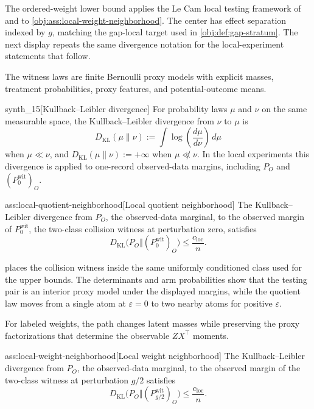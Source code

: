 The ordered-weight lower bound applies the Le Cam local testing framework of \citet{LeCam1986} and \citet{PolyanskiyWu2019} to \cref{obj:ass:local-weight-neighborhood}. The center has effect separation indexed by \(g\), matching the gap-local target used in \cref{obj:def:gap-stratum}. The next display repeats the same divergence notation for the local-experiment statements that follow.

The witness laws are finite Bernoulli proxy models with explicit masses, treatment probabilities, proxy features, and potential-outcome means.

\begin{definitionv}{synth_15}[Kullback--Leibler divergence]
For probability laws $\mu$ and $\nu$ on the same measurable space, the Kullback--Leibler divergence from $\nu$ to $\mu$ is
\[
D_{\mathrm{KL}}(\mu\|\nu):=\int \log\!\left(\frac{d\mu}{d\nu}\right)\,d\mu
\]
when $\mu\ll\nu$, and $D_{\mathrm{KL}}(\mu\|\nu):=+\infty$ when $\mu\not\ll\nu$. In the local experiments this divergence is applied to one-record observed-data margins, including $P_O$ and $(P_0^{\mathrm{wit}})_O$.
\end{definitionv}

\begin{assumptionv}{ass:local-quotient-neighborhood}[Local quotient neighborhood]
The Kullback--Leibler divergence from \(P_O\), the observed-data marginal, to the observed margin of \(P_0^{\mathrm{wit}}\), the two-class collision witness at perturbation zero, satisfies
\[
D_{\mathrm{KL}}\bigl(P_O\Vert (P_0^{\mathrm{wit}})_O\bigr)\le \frac{c_{\mathrm{loc}}}{n}.
\]
\end{assumptionv}

 places the collision witness inside the same uniformly conditioned class used for the upper bounds. The determinants and arm probabilities show that the testing pair is an interior proxy model under the displayed margins, while the quotient law moves from a single atom at \(\varepsilon=0\) to two nearby atoms for positive \(\varepsilon\).

For labeled weights, the path changes latent masses while preserving the proxy factorizations that determine the observable \(ZX^\top\) moments.

\begin{assumptionv}{ass:local-weight-neighborhood}[Local weight neighborhood]
The Kullback--Leibler divergence from \(P_O\), the observed-data marginal, to the observed margin of the two-class witness at perturbation \(g/2\) satisfies
\[
D_{\mathrm{KL}}\bigl(P_O\Vert (P_{g/2}^{\mathrm{wit}})_O\bigr)\le \frac{c_{\mathrm{loc}}}{n}.
\]
\end{assumptionv}

